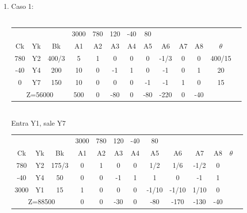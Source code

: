 \documentclass{article}
\begin{document}
\begin{enumerate}







		
		
		
	\item Caso 1:\\
     	\smallskip\\
		\begin{tabular}{|c  c  c | c  c  c  c  c  c  c  c  c | c |}
			\hline
			 \multicolumn{3}{|c|}{} & 3000 & 780 & 120 & -40 & 80 & & & & \\ 
			 Ck & Yk & Bk & A1 & A2 & A3 & A4 & A5 & A6 & A7 & A8 & $\theta$\\ \hline 
			 780 & Y2 & 400/3 & 5 & 1 & 0 & 0 & 0 & -1/3 & 0 & 0 & 400/15\\
			 -40 & Y4 & 200 & 10 & 0 & -1 & 1 & 0 & -1 & 0 & 1 & 20\\
			 0 & Y7 & 150 & 10 & 0 & 0 & 0 & -1 & -1 & 1 & 0 & 15\\ \hline
			 \multicolumn{3}{|c|}{Z=56000} & 500 & 0 & -80 & 0 & -80 & -220 & 0 & -40\\ \hline
		\end{tabular}
		\medskip\\
		Entra Y1, sale Y7\\
		\begin{tabular}{|c  c  c | c  c  c  c  c  c  c  c  c | c |}
			\hline
			 \multicolumn{3}{|c|}{} & 3000 & 780 & 120 & -40 & 80 & & & & \\ 
			 Ck & Yk & Bk & A1 & A2 & A3 & A4 & A5 & A6 & A7 & A8 & $\theta$\\ \hline 
			 780 & Y2 & 175/3 & 0 & 1 & 0 & 0 & 1/2 & 1/6 & -1/2 & 0 & \\
			 -40 & Y4 & 50 & 0 & 0 & -1 & 1 & 1 & 0 & -1 & 1 & \\
			 3000 & Y1 & 15 & 1 & 0 & 0 & 0 & -1/10 & -1/10 & 1/10 & 0 & \\ \hline
			 \multicolumn{3}{|c|}{Z=88500} & 0 & 0 & -30 & 0 & -80 & -170 & -130 & -40\\ \hline

\end{tabular}
\end{enumerate}
\end{document}
